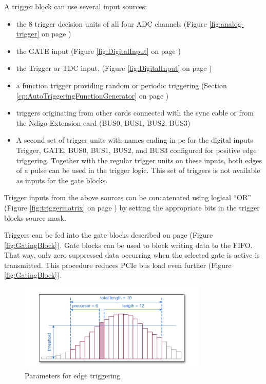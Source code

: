 A trigger block can use several input sources:

\begin{itemize}
    \item the 8 trigger decision units of all four ADC channels (Figure \ref{fig:analog-trigger} on page \pageref{fig:analog-trigger})
    \item the GATE input (Figure \ref{fig:DigitalInput} on page \pageref{fig:DigitalInput})
    \item the Trigger or TDC input,  (Figure \ref{fig:DigitalInput} on page \pageref{fig:DigitalInput})
    \item a function trigger providing random or periodic triggering (Section \ref{cp:AutoTriggeringFunctionGenerator} on page \pageref{cp:AutoTriggeringFunctionGenerator})
    \item triggers originating from other cards connected with the sync cable or from the Ndigo Extension card (BUS0, BUS1, BUS2, BUS3)
    \item A second set of trigger units with names ending in \textsf{\tu pe} for the digital inputs Trigger, GATE, BUS0, BUS1, BUS2, and BUS3 configured for positive edge triggering. Together with the regular trigger units on these inputs, both edges of a pulse can be used in the trigger logic. This set of triggers is not available as inputs for the gate blocks.
\end{itemize}

Trigger inputs from the above sources can be concatenated using logical ``OR'' (Figure \ref{fig:triggermatrix} on page \pageref{fig:triggermatrix}) by setting the appropriate bits in the trigger blocks source mask.\par

Triggers can be fed into the gate blocks described on page \pageref{fig:GatingBlock} (Figure \ref{fig:GatingBlock}). Gate blocks can be used to block writing data to the FIFO. That way, only zero suppressed data occurring when the selected gate is active is transmitted. This procedure reduces PCIe bus load even further (Figure \ref{fig:GatingBlock}).

\begin{figure}[ht]
    \centering
    \includegraphics[width=0.8\textwidth]{figures/edge-trigger.pdf}
    \caption{Parameters for edge triggering\label{fig:edge-trigger}}
\end{figure}

